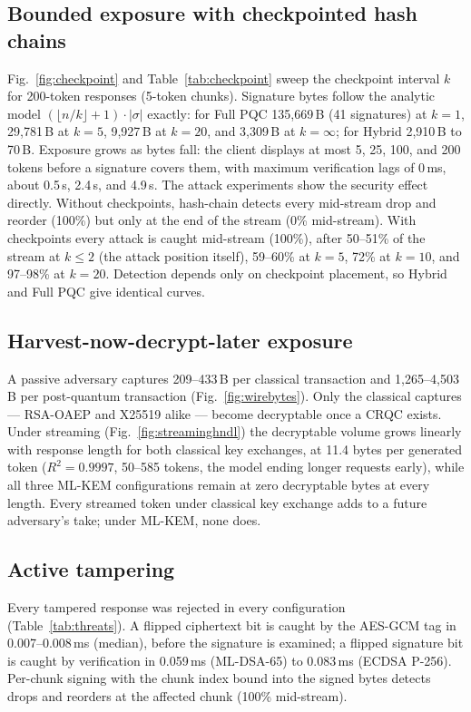 \subsection{Bounded exposure with checkpointed hash chains}\label{sec:res-checkpoint}
Fig.~\ref{fig:checkpoint} and Table~\ref{tab:checkpoint} sweep the checkpoint interval $k$ for
200-token responses (5-token chunks). Signature bytes follow the analytic model
$(\lfloor n/k\rfloor+1)\cdot|\sigma|$ exactly: for Full PQC 135,669\,B (41 signatures) at $k{=}1$,
29,781\,B at $k{=}5$, 9,927\,B at $k{=}20$, and 3,309\,B at $k{=}\infty$; for Hybrid 2,910\,B to
70\,B. Exposure grows as bytes fall: the client displays at most 5, 25, 100, and 200 tokens
before a signature covers them, with maximum verification lags of 0\,ms, about 0.5\,s, 2.4\,s, and 4.9\,s.
The attack experiments show the security effect directly. Without checkpoints, hash-chain detects
every mid-stream drop and reorder (100\%) but only at the end of the stream (0\% mid-stream). With
checkpoints every attack is caught mid-stream (100\%), after 50--51\% of the stream at $k\le2$
(the attack position itself), 59--60\% at $k{=}5$, 72\% at $k{=}10$, and 97--98\% at $k{=}20$.
Detection depends only on checkpoint placement, so Hybrid and Full PQC give identical curves.

\subsection{Harvest-now-decrypt-later exposure}\label{sec:res-hndl}
A passive adversary captures 209--433\,B per classical transaction and 1,265--4,503\,B per
post-quantum transaction (Fig.~\ref{fig:wirebytes}). Only the classical captures --- RSA-OAEP and
X25519 alike --- become decryptable once a CRQC exists. Under streaming
(Fig.~\ref{fig:streaminghndl}) the decryptable volume grows linearly with response length for both
classical key exchanges, at 11.4 bytes per generated token ($R^2{=}0.9997$, 50--585 tokens, the model
ending longer requests early), while all three ML-KEM configurations remain at zero decryptable bytes
at every length. Every streamed token under classical key exchange adds to a future adversary's
take; under ML-KEM, none does.

\subsection{Active tampering}\label{sec:res-mitm}
Every tampered response was rejected in every configuration (Table~\ref{tab:threats}). A flipped
ciphertext bit is caught by the AES-GCM tag in 0.007--0.008\,ms (median), before the signature is
examined; a flipped signature bit is caught by verification in 0.059\,ms (ML-DSA-65) to
0.083\,ms (ECDSA P-256). Per-chunk signing with the chunk index bound into the signed bytes detects
drops and reorders at the affected chunk (100\% mid-stream).

